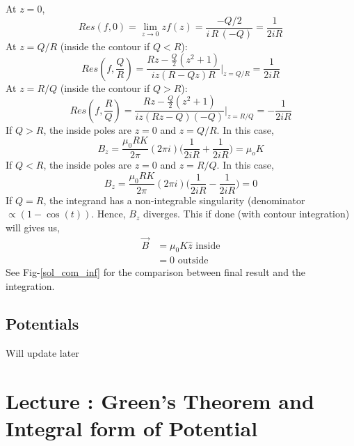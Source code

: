 \documentclass{article}
\newcommand{\lecture}[1]{
  \section{Lecture \thesection: #1}
}
\begin{document}
At $z=0$, 
\begin{equation*}
    Res(f,0) = \lim_{z\to 0}zf(z)=\frac{-Q/2}{i\,R\,(-Q)}=\frac{1}{2iR}
\end{equation*}
At $z=Q/R$ (inside the contour if $Q<R$):
\begin{equation*}
    Res(f, \frac{Q}{R}) = \frac{Rz - \frac{Q}{2}(z^2+1)}{iz(R-Qz)R}\Bigg|_{z=Q/R} = \frac{1}{2iR}
\end{equation*}
At $z=R/Q$ (inside the contour if $Q>R$):
\begin{equation*}
    Res(f, \frac{R}{Q}) = \frac{Rz - \frac{Q}{2}(z^2+1)}{iz(Rz-Q)(-Q)}\Bigg|_{z=R/Q} = -\frac{1}{2iR}
\end{equation*}
If $Q>R$, the inside poles are $z=0$ and $z=Q/R$. In this case,
\begin{equation*}
    B_z=\frac{\mu_0 R K}{2\pi}(2\pi i) \Bigg( \frac{1}{2iR}+\frac{1}{2iR} \Bigg) = \mu_o K
\end{equation*}
If $Q<R$, the inside poles are $z=0$ and $z=R/Q$. In this case,
\begin{equation*}
    B_z=\frac{\mu_0 R K}{2\pi}(2\pi i) \Bigg( \frac{1}{2iR}-\frac{1}{2iR} \Bigg) =0
\end{equation*}
If $Q=R$, the integrand has a non-integrable singularity (denominator $\propto (1-\cos(t))$. Hence, $B_z$ diverges. 
This if done (with contour integration) will gives us,
\begin{equation}
\begin{split}
    \vec{B} &= \mu_0 K \hat{z}\, \,  \text{inside}\\
    &= 0 \, \, \text{outside}
\end{split}
\end{equation}
See Fig-\ref{sol_com_inf} for the comparison between final result and the integration.
\subsection{Potentials}
Will update later
\lecture{Green's Theorem and Integral form of Potential}
\end{document}
